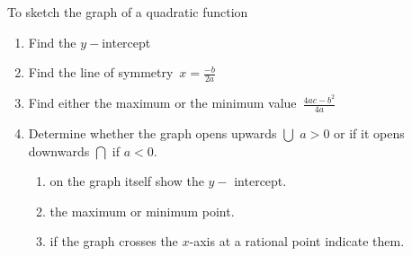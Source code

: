 \documentclass[11pt,a4paper]{article}
\theoremstyle{definition}
\begin{document}
\pagebreak
To sketch the graph of a quadratic function
\begin{enumerate}
\item Find the $y-$intercept
\item Find the line of symmetry \,$x=\frac{-b}{2a}$
\item Find either the maximum or the minimum value \,$\frac{4ac-b^2}{4a}$
\item Determine whether the graph opens upwards $\bigcup$ $a>0$ or if it opens downwards $\bigcap$ if $a<0$.
\begin{enumerate}
      \item on the graph itself show the $y-$ intercept.
      \item the maximum or minimum point.
      \item if the graph crosses the $x$-axis at a rational point indicate them.\\\\
\end{enumerate}
\end{enumerate}
\end{document}
